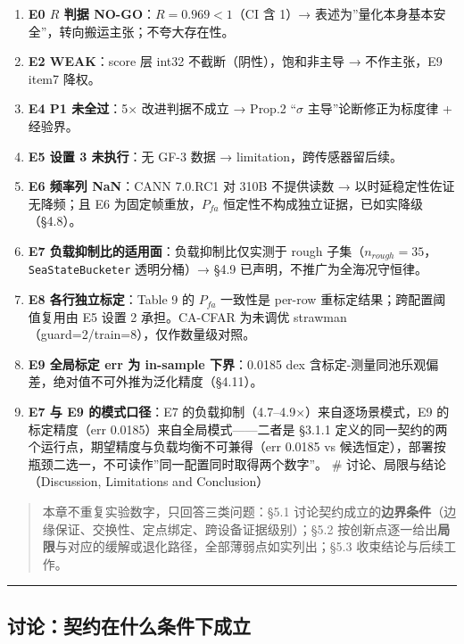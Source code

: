 \begin{enumerate}
\def\labelenumi{\arabic{enumi}.}
\tightlist
\item
  \textbf{E0 \(R\) 判据 NO-GO}：\(R=0.969<1\)（CI 含 1）→
  表述为''量化本身基本安全''，转向搬运主张；不夸大存在性。
\item
  \textbf{E2 WEAK}：score 层 int32 不截断（阴性），饱和非主导 →
  不作主张，E9 item7 降权。
\item
  \textbf{E4 P1 未全过}：5× 改进判据不成立 → Prop.2 ``\(\sigma\)
  主导''论断修正为标度律 + 经验界。
\item
  \textbf{E5 设置 3 未执行}：无 GF-3 数据 → limitation，跨传感器留后续。
\item
  \textbf{E6 频率列 NaN}：CANN 7.0.RC1 对 310B 不提供读数 →
  以时延稳定性佐证无降频；且 E6 为固定帧重放，\(P_{fa}\)
  恒定性不构成独立证据，已如实降级（§4.8）。
\item
  \textbf{E7 负载抑制比的适用面}：负载抑制比仅实测于 rough
  子集（\(n_{rough}=35\)，\texttt{SeaStateBucketer} 透明分桶）→ §4.9
  已声明，不推广为全海况守恒律。
\item
  \textbf{E8 各行独立标定}：Table 9 的 \(P_{fa}\) 一致性是 per-row
  重标定结果；跨配置阈值复用由 E5 设置 2 承担。CA-CFAR 为未调优
  strawman（guard=2/train=8），仅作数量级对照。
\item
  \textbf{E9 全局标定 err 为 in-sample 下界}：0.0185 dex
  含标定-测量同池乐观偏差，绝对值不可外推为泛化精度（§4.11）。
\item
  \textbf{E7 与 E9 的模式口径}：E7
  的负载抑制（4.7--4.9×）来自逐场景模式，E9 的标定精度（err
  0.0185）来自全局模式------二者是 §3.1.1
  定义的同一契约的两个运行点，期望精度与负载均衡不可兼得（err 0.0185 vs
  候选恒定），部署按瓶颈二选一，不可读作''同一配置同时取得两个数字''。
  \# 讨论、局限与结论（Discussion, Limitations and Conclusion）
\end{enumerate}

\begin{quote}
本章不重复实验数字，只回答三类问题：§5.1
讨论契约成立的\textbf{边界条件}（边缘保证、交换性、定点绑定、跨设备证据级别）；§5.2
按创新点逐一给出\textbf{局限}与对应的缓解或退化路径，全部薄弱点如实列出；§5.3
收束结论与后续工作。
\end{quote}

\begin{center}\rule{0.5\linewidth}{0.5pt}\end{center}

\subsection{讨论：契约在什么条件下成立}\label{ux8ba8ux8bbaux5951ux7ea6ux5728ux4ec0ux4e48ux6761ux4ef6ux4e0bux6210ux7acb}

